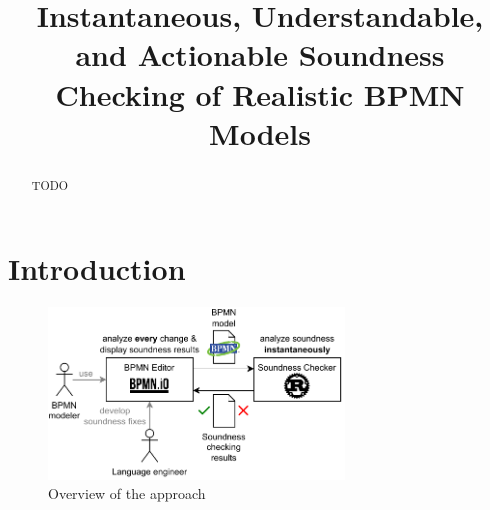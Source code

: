 \documentclass[runningheads]{llncs}
\begin{document}
%
\title{Instantaneous, Understandable, and Actionable Soundness Checking of Realistic BPMN Models}
%
%
%
\maketitle              %
%
\begin{abstract}
TODO
\end{abstract}


\renewcommand{\labelenumi}{(\textbf{\arabic{enumi})}}

\section{Introduction} \label{sec:introduction}

\cite{fahlandAnalysisDemandInstantaneous2011}




\begin{figure}[ht]
	\centering
	\includegraphics[width=0.7\textwidth]{images/overview}
	\caption{Overview of the approach}
	\label{fig:overview}
\end{figure}
\end{document}
